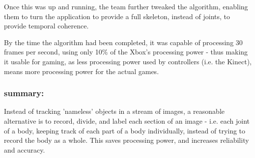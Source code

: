 Once this was up and running, the team further tweaked the algorithm, enabling them to turn the application to provide a full skeleton, instead of joints, to provide temporal coherence.

By the time the algorithm had been completed, it was capable of processing 30 frames per second, using only 10\% of the Xbox's processing power - thus making it usable for gaming, as less processing power used by controllers (i.e. the Kinect), means more processing power for the actual games.

\subsubsection*{summary:}
Instead of tracking 'nameless' objects in a stream of images, a reasonable alternative is to record, divide, and label each section of an image - i.e. each joint of a body, keeping track of each part of a body individually, instead of trying to record the body as a whole. This saves processing power, and increases reliability and accuracy.